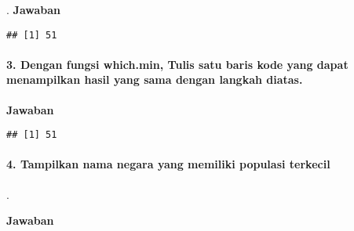 \documentclass[
]{article}
\newenvironment{Shaded}{\begin{snugshade}}{\end{snugshade}}
\newcommand{\DecValTok}[1]{\textcolor[rgb]{0.00,0.00,0.81}{#1}}
\newcommand{\FunctionTok}[1]{\textcolor[rgb]{0.00,0.00,0.00}{#1}}
\newcommand{\NormalTok}[1]{#1}
\newcommand{\SpecialCharTok}[1]{\textcolor[rgb]{0.00,0.00,0.00}{#1}}
\begin{document}
. \textbf{Jawaban}

\begin{Shaded}
\end{Shaded}

\begin{verbatim}
## [1] 51
\end{verbatim}

\hypertarget{dengan-fungsi-which.min-tulis-satu-baris-kode-yang-dapat-menampilkan-hasil-yang-sama-dengan-langkah-diatas.}{%
\paragraph{3. Dengan fungsi which.min, Tulis satu baris kode yang dapat
menampilkan hasil yang sama dengan langkah
diatas.}\label{dengan-fungsi-which.min-tulis-satu-baris-kode-yang-dapat-menampilkan-hasil-yang-sama-dengan-langkah-diatas.}}

\textbf{Jawaban}

\begin{Shaded}
\end{Shaded}

\begin{verbatim}
## [1] 51
\end{verbatim}

\hypertarget{tampilkan-nama-negara-yang-memiliki-populasi-terkecil}{%
\paragraph{4. Tampilkan nama negara yang memiliki populasi
terkecil}\label{tampilkan-nama-negara-yang-memiliki-populasi-terkecil}}

.

\textbf{Jawaban}

\begin{Shaded}
\end{Shaded}
\end{document}
